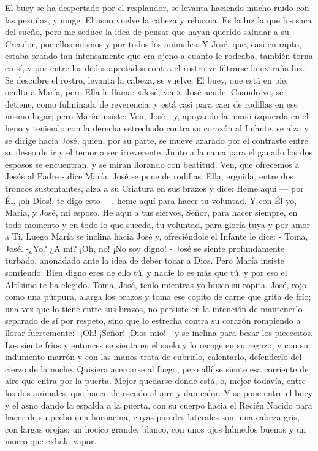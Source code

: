 \documentclass[12pt]{book} %
\begin{document}
El buey se ha despertado por el resplandor, se levanta haciendo mucho ruido con las pezuñas, y muge. El asno vuelve la 
cabeza y rebuzna. Es la luz la que los saca del sueño, pero me seduce la idea de pensar que hayan querido saludar a su Creador, por ellos mismos y por todos los animales. 
Y José, que, casi en rapto, estaba orando tan intensamente que era ajeno a cuanto le rodeaba, también torna en sí, y 
por entre los dedos apretados contra el rostro ve filtrarse la extraña luz. Se descubre el rostro, levanta la cabeza, se vuelve. El buey, que está en pie, oculta a María, pero Ella le llama: «José, ven». 
José acude. Cuando ve, se detiene, como fulminado de reverencia, y está casi para caer de rodillas en ese mismo lugar; 
pero María insiste: 
Ven, José - y, apoyando la mano izquierda en el heno y teniendo con la derecha estrechado contra su corazón al Infante, se alza y se dirige hacia José, quien, por su parte, se mueve azarado por el contraste entre su deseo de ir y el temor a ser irreverente. 
Junto a la cama para el ganado los dos esposos se encuentran, y se miran llorando con beatitud. 
Ven, que ofrecemos a Jesús al Padre - dice María. José se pone de rodillas. Ella, erguida, entre dos troncos 
sustentantes, alza a su Criatura en sus brazos y dice: 
Heme aquí — por Él, ¡oh Dios!, te digo esto —, heme aquí para hacer tu voluntad. Y con Él yo, María, y José, mi esposo. He aquí a tus siervos, Señor, para hacer siempre, en todo momento y en todo lo que suceda, tu voluntad, para gloria tuya y por amor a Ti. 
Luego María se inclina hacia José y, ofreciéndole el Infante le dice: - Toma, José. 
-¿Yo? ¿A mí? ¡Oh, no! ¡No soy digno! - José se siente profundamente turbado, anonadado ante la idea de deber tocar a Dios. 
Pero María insiste sonriendo: 
Bien digno eres de ello tú, y nadie lo es más que tú, y por eso el Altísimo te ha elegido. Toma, José, tenlo mientras yo 
busco su ropita. 
José, rojo como una púrpura, alarga los brazos y toma ese copito de carne que grita de frío; una vez que lo tiene entre sus brazos, no persiste en la intención de mantenerlo separado de sí por respeto, sino que lo estrecha contra su corazón rompiendo a llorar fuertemente: 
-¡Oh! ¡Señor! ¡Dios mío! - y se inclina para besar los piececitos. Los siente fríos y entonces se sienta en el suelo y lo 
recoge en su regazo, y con su indumento marrón y con las manos trata de cubrirlo, calentarlo, defenderlo del cierzo de la noche. Quisiera acercarse al fuego, pero allí se siente esa corriente de aire que entra por la puerta. Mejor quedarse donde está, o, mejor todavía, entre los dos animales, que hacen de escudo al aire y dan calor. Y se pone entre el buey y el asno dando la espalda a la puerta, con su cuerpo hacia el Recién Nacido para hacer de su pecho una hornacina, cuyas paredes laterales son: una cabeza gris, con largas orejas; un hocico grande, blanco, con unos ojos húmedos buenos y un morro que exhala vapor. 
\end{document}
